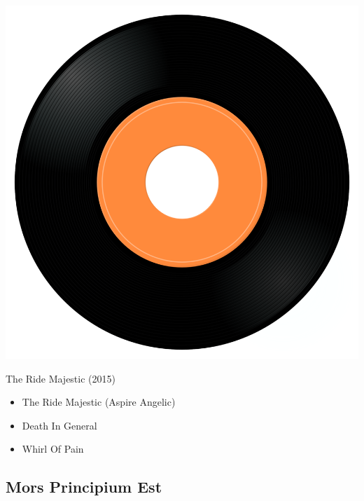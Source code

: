 \begin{minipage}[t]{0.25\textwidth}\vspace{0pt}
\captionsetup{type=figure}
\includegraphics[width=\textwidth]{Images/cover.png}
\caption*{The Ride Majestic (2015)}
\end{minipage}
\begin{minipage}[t]{0.25\textwidth}\vspace{0pt}
\begin{itemize}[nosep,leftmargin=1em,labelwidth=*,align=left]
	\setlength{\itemsep}{0pt}
	\item The Ride Majestic (Aspire Angelic)
	\item Death In General
	\item Whirl Of Pain
\end{itemize}
\end{minipage}


\subsection{Mors Principium Est}

